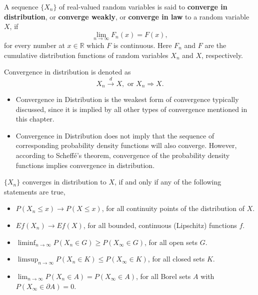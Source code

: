 \begin{definition} \label{def:convergence-in-distribution}
	A sequence $\{X_n\}$ of real-valued random variables is said to \textbf{converge in distribution}, or \textbf{converge weakly}, or \textbf{converge in law} to a random variable $X$, if
	\begin{equation}
		\lim_{n\to\infty}F_n(x)=F(x),
	\end{equation}
	for every number at $x\in\mathbb{R}$ which $F$ is continuous. Here $F_n$ and $F$ are the cumulative distribution functions of random variables $X_n$ and $X$, respectively.

	Convergence in distribution is denoted as
	\begin{equation}
		X_n \stackrel{d}{\rightarrow} X, \text{ or } X_n \Rightarrow X.
	\end{equation}
\end{definition}

\begin{itemize}
	\item Convergence in Distribution is the weakest form of convergence typically discussed, since it is implied by all other types of convergence mentioned in this chapter.
	\item Convergence in Distribution does not imply that the sequence of corresponding probability density functions will also converge. However, according to Scheff\'e's theorem, convergence of the probability density functions implies convergence in distribution.
\end{itemize}

\begin{theorem} \label{thm:portmanteau-lemma}
	$\{X_n\}$ converges in distribution to $X$, if and only if any of the following statements are true,
	\begin{itemize}
		\item $P(X_n\leq x)\rightarrow P(X\leq x)$, for all continuity points of the distribution of $X$.
		\item $Ef(X_n)\rightarrow Ef(X)$, for all bounded, continuous (Lipschitz) functions $f$.
		\item $\liminf_{n\rightarrow\infty}P\left(X_{n} \in G\right)\geq P\left(X_{\infty}\in G\right)$, for all open sets $G$.
		\item $\limsup_{n \rightarrow\infty}P\left(X_{n} \in K\right) \leq P\left(X_{\infty} \in K\right)$, for all closed sets $K$.
		\item $\lim_{n\rightarrow\infty}P\left(X_{n}\in A\right)=P\left(X_{\infty}\in A\right)$, for all Borel sets $A$ with $P\left(X_{\infty}\in \partial A\right)=0$.
	\end{itemize}
\end{theorem}

